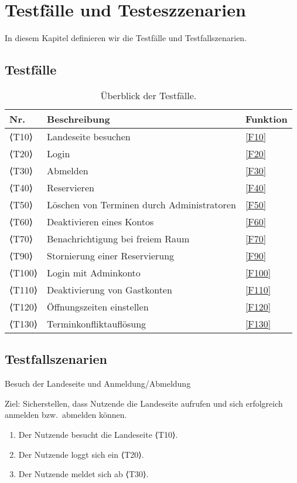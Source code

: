 \chapter{Testfälle und Testeszzenarien}
\label{chap:test}
In diesem Kapitel definieren wir die Testfälle und Testfallszenarien.

\section{Testfälle}

\begin{table}[htbp]
  \centering
  \begin{tabularx}{\textwidth}{ l|X|l }
      \textbf{Nr.} & \textbf{Beschreibung} & \textbf{Funktion} \\ \hline\hline
      ⟨T10⟩ & Landeseite besuchen &\ref{F10}\\
      ⟨T20⟩ & Login &\ref{F20} \\
      ⟨T30⟩ & Abmelden &\ref{F30} \\
      ⟨T40⟩ & Reservieren &\ref{F40} \\
      ⟨T50⟩ & Löschen von Terminen durch Administratoren &\ref{F50} \\
      ⟨T60⟩ & Deaktivieren eines Kontos &\ref{F60} \\
      ⟨T70⟩ & Benachrichtigung bei freiem Raum &\ref{F70} \\
      ⟨T90⟩ & Stornierung einer Reservierung &\ref{F90} \\
      ⟨T100⟩& Login mit Adminkonto &\ref{F100} \\
      ⟨T110⟩ & Deaktivierung von Gastkonten &\ref{F110} \\
      ⟨T120⟩& Öffnungszeiten einstellen &\ref{F120} \\
      ⟨T130⟩& Terminkonfliktauflösung &\ref{F130} \\
  \end{tabularx}
  \caption{Überblick der Testfälle.}
  \label{tab:test_table}
\end{table}

\pagebreak

\section{Testfallszenarien}\label{sec:testfallszenarien}
\begin{scenario}{10}{Besuch der Landeseite und Anmeldung/Abmeldung}
  \item[Ziel:] Sicherstellen, dass Nutzende die Landeseite aufrufen und sich erfolgreich anmelden bzw.\ abmelden können.
  \begin{enumerate}
    \item Der Nutzende besucht die Landeseite ⟨T10⟩.
    \item Der Nutzende loggt sich ein ⟨T20⟩.
    \item Der Nutzende meldet sich ab ⟨T30⟩.
  \end{enumerate}
\end{scenario}

